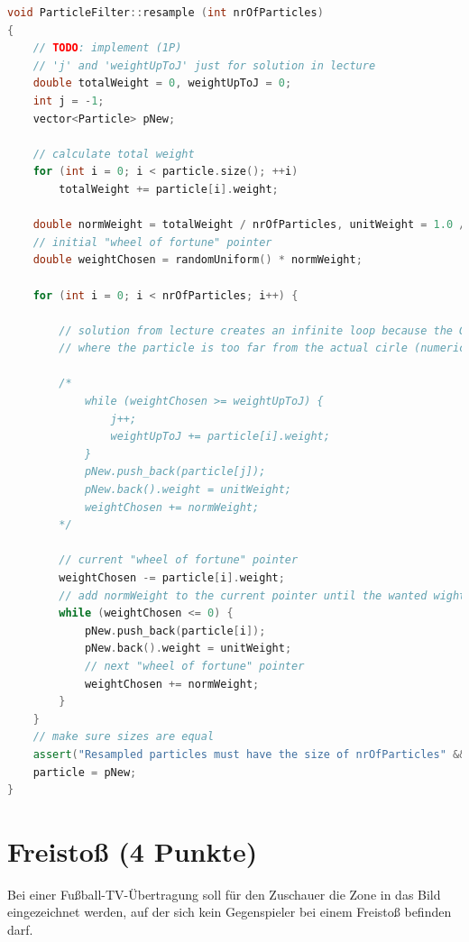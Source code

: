 \documentclass{ezb}
\begin{document}
\begin{lstlisting}[language=C++, caption=Draw particles from the particle set]
void ParticleFilter::resample (int nrOfParticles)
{
	// TODO: implement (1P)
	// 'j' and 'weightUpToJ' just for solution in lecture
	double totalWeight = 0, weightUpToJ = 0;
	int j = -1;
	vector<Particle> pNew;

	// calculate total weight
	for (int i = 0; i < particle.size(); ++i)
		totalWeight += particle[i].weight;

	double normWeight = totalWeight / nrOfParticles, unitWeight = 1.0 / nrOfParticles;
	// initial "wheel of fortune" pointer
	double weightChosen = randomUniform() * normWeight;

	for (int i = 0; i < nrOfParticles; i++) {

		// solution from lecture creates an infinite loop because the Gaussian distribution becomes 0 at some points
		// where the particle is too far from the actual cirle (numerical underflow)

		/*
			while (weightChosen >= weightUpToJ) {
				j++;
				weightUpToJ += particle[i].weight;
			}
			pNew.push_back(particle[j]);
			pNew.back().weight = unitWeight;
			weightChosen += normWeight;
		*/

		// current "wheel of fortune" pointer
		weightChosen -= particle[i].weight;
		// add normWeight to the current pointer until the wanted wight is archieved
		while (weightChosen <= 0) {
			pNew.push_back(particle[i]);
			pNew.back().weight = unitWeight;
			// next "wheel of fortune" pointer
			weightChosen += normWeight;
		}
	}
	// make sure sizes are equal
	assert("Resampled particles must have the size of nrOfParticles" && pNew.size() == nrOfParticles);
	particle = pNew;
}
\end{lstlisting}
\newpage
\section{Freistoß (4 Punkte)}
Bei einer Fußball-TV-Übertragung soll für den Zuschauer die Zone in das Bild eingezeichnet werden, auf der sich kein Gegenspieler bei einem Freistoß befinden darf.
\end{document}
